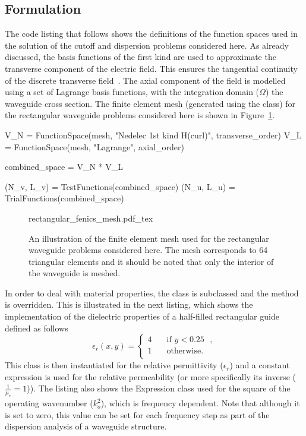 \subsection{Formulation}

The code listing that follows shows the definitions of the function
spaces used in the solution of the cutoff and dispersion problems
considered here. As already discussed, the \nedelec{} basis functions of
the first kind are used to approximate the transverse component of the
electric field. This ensures the tangential continuity of the discrete
transverse field~\citep{Jin2002}.  The axial component of the field is
modelled using a set of Lagrange basis functions, with the integration
domain ($\Omega$) the waveguide cross section. The finite element mesh
(generated using the \dolfin{}  class) for the
rectangular waveguide problems considered here is shown in
Figure~\ref{fig:lezar:rectangular_fenics_mesh}.
\begin{python}
V_N = FunctionSpace(mesh, "Nedelec 1st kind H(curl)", transverse_order)
V_L = FunctionSpace(mesh, "Lagrange", axial_order)

combined_space = V_N * V_L

(N_v, L_v) = TestFunctions(combined_space)
(N_u, L_u) = TrialFunctions(combined_space)
\end{python}

\begin{figure}
  \centering
    \def\svgwidth{\smallfig}
  {rectangular_fenics_mesh.pdf_tex}
  \caption{An illustration of the finite element mesh used for the
  rectangular waveguide problems considered here. The mesh corresponds
  to 64 triangular elements and it should be noted that only the interior
  of the waveguide is meshed.}
  \label{fig:lezar:rectangular_fenics_mesh}
\end{figure}

In order to deal with material properties, the  class
is subclassed and the  method is overridden. This is illustrated
in the next listing, which shows the implementation of the dielectric
properties of a half-filled rectangular guide defined as follows
\begin{equation}
\label{eq:lezar:half_filled_dielectric}
\epsilon_r (x,y) =
\begin{cases}
  4\quad &\text{if $y < 0.25$ },\\
  1\quad &\text{otherwise}.\\
\end{cases}
\end{equation}
This class is then instantiated for the relative permittivity
($\epsilon_r$) and a constant expression is used for the relative
permeability (or more specifically its inverse ($\frac{1}{\mu_r}
= 1$)). The listing also shows the Expression class used for the
square of the operating wavenumber ($k_o^2$), which is frequency
dependent. Note that although it is set to zero, this value can
be set for each frequency step as part of the dispersion analysis of a
waveguide structure.

